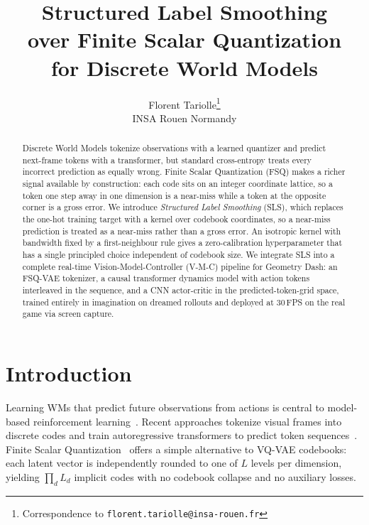 \documentclass{article}
\title{Structured Label Smoothing\\over Finite Scalar Quantization\\for Discrete World Models}
\author{%
  Florent Tariolle\thanks{\normalsize Correspondence to \texttt{florent.tariolle@insa-rouen.fr}} \\
  INSA Rouen Normandy
}
\newcommand{\headerlink}[3]{\href{#3}{\linkbutton{\ttfamily#1~#2}}}
\begin{document}
\maketitle

\vspace{-2.3em}
\begin{center}
  \headerlink{\faGlobe}{Website}{https://tariolle.github.io/sls-wm}\hspace{1em}%
  \headerlink{\faGithub}{Code}{https://github.com/Tariolle/sls-wm}
\end{center}

\begin{abstract}
Discrete World Models tokenize observations with a learned quantizer and predict next-frame tokens with a transformer, but standard cross-entropy treats every incorrect prediction as equally wrong.
Finite Scalar Quantization (FSQ) makes a richer signal available by construction: each code sits on an integer coordinate lattice, so a token one step away in one dimension is a near-miss while a token at the opposite corner is a gross error.
We introduce \emph{Structured Label Smoothing} (SLS), which replaces the one-hot training target with a kernel over codebook coordinates, so a near-miss prediction is treated as a near-miss rather than a gross error.
An isotropic kernel with bandwidth fixed by a first-neighbour rule gives a zero-calibration hyperparameter that has a single principled choice independent of codebook size.
We integrate SLS into a complete real-time Vision-Model-Controller (V-M-C) pipeline for Geometry Dash: an FSQ-VAE tokenizer, a causal transformer dynamics model with action tokens interleaved in the sequence, and a CNN actor-critic in the predicted-token-grid space, trained entirely in imagination on dreamed rollouts and deployed at 30\,FPS on the real game via screen capture.
\end{abstract}

\section{Introduction}
\label{sec:intro}

Learning WMs that predict future observations from actions is central to model-based reinforcement learning~\citep{ha2018world}.
Recent approaches tokenize visual frames into discrete codes and train autoregressive transformers to predict token sequences~\citep{micheli2023iris, hafner2025dreamerv3}.
Finite Scalar Quantization~\citep{mentzer2024fsq} offers a simple alternative to VQ-VAE codebooks: each latent vector is independently rounded to one of $L$ levels per dimension, yielding $\prod_d L_d$ implicit codes with no codebook collapse and no auxiliary losses.
\end{document}
